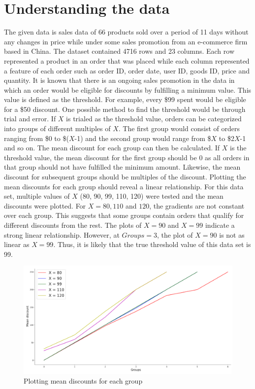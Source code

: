 \documentclass[a4paper]{article}
\begin{document}
\section{Understanding the data}
\label{sec:introduction}
The given data is sales data of 66 products sold over a period of 11 days without any changes in price while under some sales promotion from an e-commerce firm based in China. The dataset contained 4716 rows and 23 columns. Each row represented a product in an order that was placed while each column represented a feature of each order such as order ID, order date, user ID, goods ID, price and quantity.
\newline
\newline
It is known that there is an ongoing sales promotion in the data in which an order would be eligible for discounts by fulfilling a minimum value. This value is defined as the threshold. For example, every \$99 spent would be eligible for a \$50 discount. One possible method to find the threshold would be through trial and error.
\newline
\newline
If $X$ is trialed as the threshold value, orders can be categorized into groups of different multiples of $X$. The first group would consist of orders ranging from \$0 to \$($X$-1) and the second group would range from \$$X$ to \$2$X$-1 and so on. The mean discount for each group can then be calculated. If $X$ is the threshold value, the mean discount for the first group should be 0 as all orders in that group should not have fulfilled the minimum amount. Likewise, the mean discount for subsequent groups should be multiples of the discount. Plotting the mean discounts for each group should reveal a linear relationship.
\newline
\newline
For this data set, multiple values of $X$ (80, 90, 99, 110, 120) were tested and the mean discounts were plotted. For $X = 80, 110$ and $120$, the gradients are not constant over each group. This suggests that some groups contain orders that qualify for different discounts from the rest. The plots of $X = 90$ and $X = 99$ indicate a strong linear relationship. However, at $Groups = 3$, the plot of $X = 90$ is not as linear as $X=99$. Thus, it is likely that the true threshold value of this data set is 99.

\begin{figure}
	\centering
	\includegraphics[width=1\textwidth]{cut.png}
	\caption{\label{fig:cut}Plotting mean discounts for each group}
\end{figure}
\end{document}
